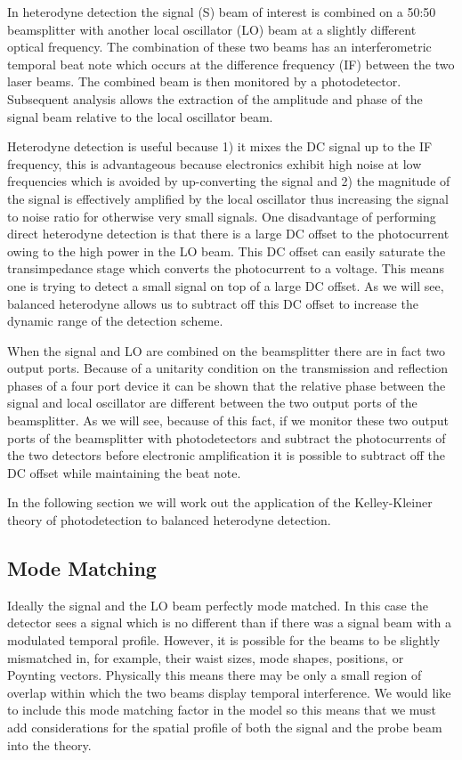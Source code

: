 \documentclass[12pt]{article}
\begin{document}
In heterodyne detection the signal (S) beam of interest is combined on a 50:50 beamsplitter with another local oscillator (LO) beam at a slightly different optical frequency. The combination of these two beams has an interferometric temporal beat note which occurs at the difference frequency (IF) between the two laser beams. The combined beam is then monitored by a photodetector. Subsequent analysis allows the extraction of the amplitude and phase of the signal beam relative to the local oscillator beam.

Heterodyne detection is useful because 1) it mixes the DC signal up to the IF frequency, this is advantageous because electronics exhibit high noise at low frequencies which is avoided by up-converting the signal and 2) the magnitude of the signal is effectively amplified by the local oscillator thus increasing the signal to noise ratio for otherwise very small signals. One disadvantage of performing direct heterodyne detection is that there is a large DC offset to the photocurrent owing to the high power in the LO beam. This DC offset can easily saturate the transimpedance stage which converts the photocurrent to a voltage. This means one is trying to detect a small signal on top of a large DC offset. As we will see, balanced heterodyne allows us to subtract off this DC offset to increase the dynamic range of the detection scheme.

When the signal and LO are combined on the beamsplitter there are in fact two output ports. Because of a unitarity condition on the transmission and reflection phases of a four port device it can be shown that the relative phase between the signal and local oscillator are different between the two output ports of the beamsplitter. As we will see, because of this fact, if we monitor these two output ports of the beamsplitter with photodetectors and subtract the photocurrents of the two detectors before electronic amplification it is possible to subtract off the DC offset while maintaining the beat note.

In the following section we will work out the application of the Kelley-Kleiner theory of photodetection to balanced heterodyne detection.

\subsection{Mode Matching}
Ideally the signal and the LO beam perfectly mode matched. In this case the detector sees a signal which is no different than if there was a signal beam with a modulated temporal profile. However, it is possible for the beams to be slightly mismatched in, for example, their waist sizes, mode shapes, positions, or Poynting vectors. Physically this means there may be only a small region of overlap within which the two beams display temporal interference. We would like to include this mode matching factor in the model so this means that we must add considerations for the spatial profile of both the signal and the probe beam into the theory.
\end{document}
